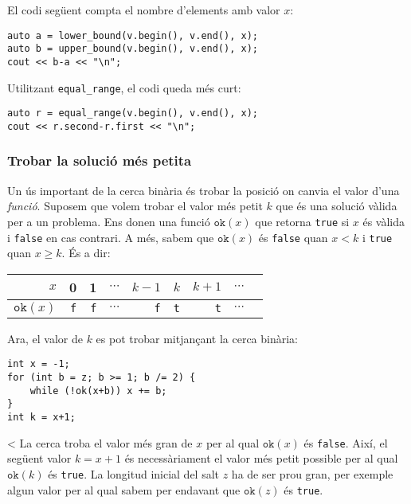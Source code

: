 El codi següent compta el nombre d'elements
amb valor $x$:

\begin{lstlisting}
auto a = lower_bound(v.begin(), v.end(), x);
auto b = upper_bound(v.begin(), v.end(), x);
cout << b-a << "\n";
\end{lstlisting}

Utilitzant \texttt{equal\_range}, el codi queda més curt:

\begin{lstlisting}
auto r = equal_range(v.begin(), v.end(), x);
cout << r.second-r.first << "\n";
\end{lstlisting}

\subsubsection{Trobar la solució més petita}

Un ús important de la cerca binària és
trobar la posició on canvia el valor d'una \emph{funció}.
Suposem que volem trobar el valor més petit $k$
que és una solució vàlida per a un problema.
Ens donen una funció $\texttt{ok}(x)$
que retorna \texttt{true} si $x$ és vàlida
i \texttt{false} en cas contrari.
A més, sabem que $\texttt{ok}(x)$ és \texttt{false}
quan $x<k$ i \texttt{true} quan $x \ge k$.
És a dir:

\begin{center}
\begin{tabular}{r|rrrrrrrr}
$x$ & 0 & 1 & $\cdots$ & $k-1$ & $k$ & $k+1$ & $\cdots$ \\
\hline
$\texttt{ok}(x)$ & \texttt{f} & \texttt{f}
& $\cdots$ & \texttt{f} & \texttt{t} & \texttt{t} & $\cdots$ \\
\end{tabular}
\end{center}

\noindent
Ara, el valor de $k$ es pot trobar mitjançant la cerca binària:

\begin{lstlisting}
int x = -1;
for (int b = z; b >= 1; b /= 2) {
    while (!ok(x+b)) x += b;
}
int k = x+1;
\end{lstlisting}
<
La cerca troba el valor més gran de $x$ per al qual
$\texttt{ok}(x)$ és \texttt{false}.
Així, el següent valor $k=x+1$
és necessàriament el valor més petit possible per al qual
$\texttt{ok}(k)$ és \texttt{true}.
La longitud inicial del salt $z$ ha de ser
prou gran, per exemple algun valor
per al qual sabem per endavant que $\texttt{ok}(z)$ és \texttt{true}.

